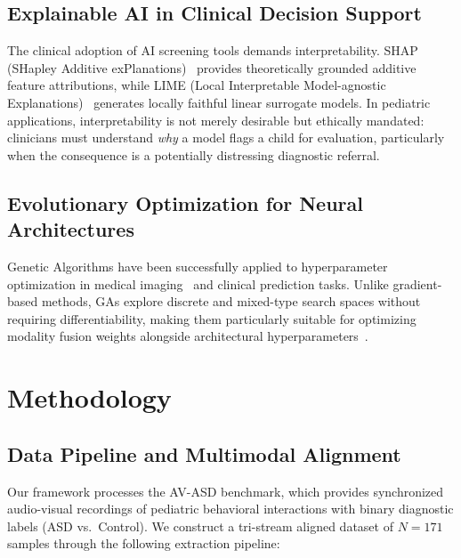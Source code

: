 \documentclass[conference]{IEEEtran}
\begin{document}
\subsection{Explainable AI in Clinical Decision Support}

The clinical adoption of AI screening tools demands interpretability. SHAP (SHapley Additive exPlanations)~\cite{lundberg2017shap} provides theoretically grounded additive feature attributions, while LIME (Local Interpretable Model-agnostic Explanations)~\cite{ribeiro2016lime} generates locally faithful linear surrogate models. In pediatric applications, interpretability is not merely desirable but ethically mandated: clinicians must understand \textit{why} a model flags a child for evaluation, particularly when the consequence is a potentially distressing diagnostic referral.

\subsection{Evolutionary Optimization for Neural Architectures}

Genetic Algorithms have been successfully applied to hyperparameter optimization in medical imaging~\cite{young2015optimizing} and clinical prediction tasks. Unlike gradient-based methods, GAs explore discrete and mixed-type search spaces without requiring differentiability, making them particularly suitable for optimizing modality fusion weights alongside architectural hyperparameters~\cite{deb2002fast}.

\section{Methodology}
\label{sec:methodology}

\subsection{Data Pipeline and Multimodal Alignment}

Our framework processes the AV-ASD benchmark, which provides synchronized audio-visual recordings of pediatric behavioral interactions with binary diagnostic labels (ASD vs.\ Control). We construct a tri-stream aligned dataset of $N=171$ samples through the following extraction pipeline:
\end{document}
